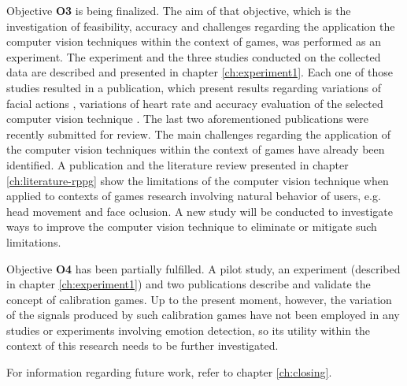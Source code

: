 Objective \textbf{O3} is being finalized. The aim of that objective, which is the investigation of feasibility, accuracy and challenges regarding the application the computer vision techniques within the context of games, was performed as an experiment. The experiment and the three studies conducted on the collected data are described and presented in chapter \ref{ch:experiment1}. Each one of those studies resulted in a publication, which present results regarding variations of facial actions \parencite{bevilacqua2016variations}, variations of heart rate \parencite{bevilacqua2017changes} and accuracy evaluation of the selected computer vision technique \parencite{bevilacqua2017accuracy}. The last two aforementioned publications were recently submitted for review. The main challenges regarding the application of the computer vision techniques within the context of games have already been identified. A publication \parencite{bevilacqua2017accuracy} and the literature review presented in chapter \ref{ch:literature-rppg} show the limitations of the computer vision technique when applied to contexts of games research involving natural behavior of users, e.g. head movement and face oclusion. A new study will be conducted to investigate ways to improve the computer vision technique to eliminate or mitigate such limitations.

Objective \textbf{O4} has been partially fulfilled. A pilot study, an experiment (described in chapter \ref{ch:experiment1}) and two publications \parencite{bevilacqua2016variations,bevilacqua2017changes} describe and validate the concept of calibration games. Up to the present moment, however, the variation of the signals produced by such calibration games have not been employed in any studies or experiments involving emotion detection, so its utility within the context of this research needs to be further investigated.

For information regarding future work, refer to chapter \ref{ch:closing}.
